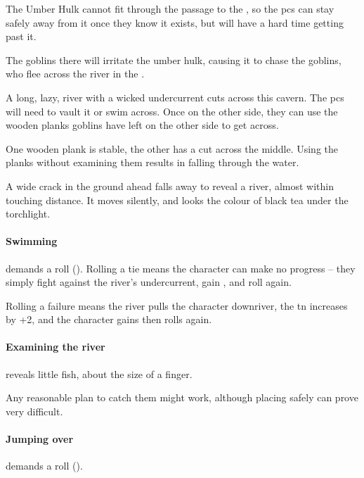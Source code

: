 \begin{multicols}{2}
The Umber Hulk cannot fit through the passage to the , so the \glspl{pc} can stay safely away from it once they know it exists, but will have a hard time getting past it.

\umberhulk

The goblins there will irritate the umber hulk, causing it to chase the goblins, who flee across the river in the .


A long, lazy, river with a wicked undercurrent cuts across this cavern.
The \glspl{pc} will need to vault it or swim across.
Once on the other side, they can use the wooden planks goblins have left on the other side to get across.

One wooden plank is stable, the other has a cut across the middle.
Using the planks without examining them results in  falling through the water.

\begin{boxtext}
  A wide crack in the ground ahead falls away to reveal a river, almost within touching distance.
  It moves silently, and looks the colour of black tea under the torchlight.
\end{boxtext}

\paragraph{Swimming}
demands a  roll (\tn[10]).
Rolling a tie means the character can make no progress -- they simply fight against the river's undercurrent, gain , and roll again.

Rolling a failure means the river pulls the character downriver, the \gls{tn} increases by +2, and the character gains  then rolls again.

\paragraph{Examining the river}
reveals little fish, about the size of a finger.

Any reasonable plan to catch them might work, although placing  safely can prove very difficult.

\paragraph{Jumping over}
demands a  roll (\tn[12]).


\end{multicols}
